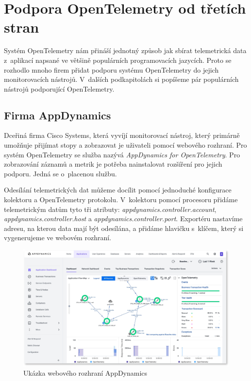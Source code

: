\section{Podpora OpenTelemetry od třetích stran}
Systém OpenTelemetry nám přináší jednotný způsob jak sbírat telemetrická data z~aplikací napsané ve většině populárních programovacích jazycích. Proto se rozhodlo mnoho firem přidat podporu systému OpenTelemetry do jejich monitorovacích nástrojů. V~dalších podkapitolách si popíšeme pár populárních nástrojů podporující OpenTelemetry.

\subsection{Firma AppDynamics}

Dceřiná firma Cisco Systems, která vyvíjí monitorovací nástroj, který primárně umožňuje přijímat stopy a zobrazovat je uživateli pomocí webového rozhraní. Pro systém OpenTelemetry se služba nazývá \textit{AppDynamics for OpenTelemetry}. Pro zobrazování záznamů a metrik je potřeba nainstalovat rozšíření pro jejich podporu. Jedná se o~placenou službu.

Odesílání telemetrických dat můžeme docílit pomocí jednoduché konfigurace kolektoru a OpenTelemetry protokolu. V~kolektoru pomocí procesoru přidáme telemetrickým datům tyto tři atributy: \textit{appdynamics.controller.account}, \textit{appdynamics.controller.host} a \textit{appdynamics.controller.port}. Exportéru nastavíme adresu, na kterou data mají být odesílána, a přidáme hlavičku s~klíčem, který si vygenerujeme ve webovém rozhraní.

\begin{figure}[H]
  \centering
  \includegraphics[width=15cm]{obrazky-figures/Application_Dashboard.jpeg}
  \caption{Ukázka webového rozhraní AppDynamics\protect\footnotemark}
  \label{fig:dynamics}
\end{figure}

